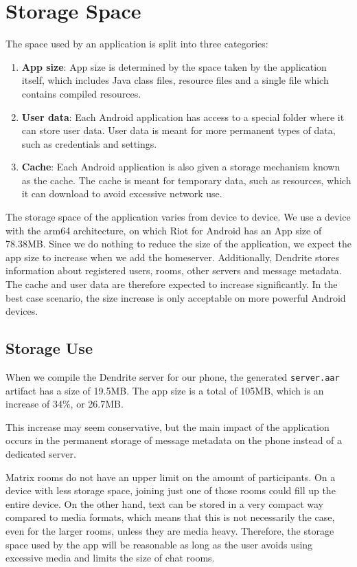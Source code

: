 \section{Storage Space}\label{sec:storage_space}
The space used by an application is split into three categories:
\begin{enumerate}
	\item{
	      \textbf{App size}:
		  App size is determined by the space taken by the application itself, which includes Java class files, resource files and a single file which contains compiled resources\cite{android_devdocs_apksize}.
	      }
	\item{
	      \textbf{User data}:
		  Each Android application has access to a special folder where it can store user data.
		  User data is meant for more permanent types of data, such as credentials and settings.
	      }
	\item{
	      \textbf{Cache}:
		  Each Android application is also given a storage mechanism known as the cache.
		  The cache is meant for temporary data, such as resources, which it can download to avoid excessive network use.
	      }
\end{enumerate}

The storage space of the application varies from device to device.
We use a device with the arm64 architecture, on which Riot for Android has an App size of 78.38MB\@.
Since we do nothing to reduce the size of the application, we expect the app size to increase when we add the homeserver.
Additionally, Dendrite stores information about registered users, rooms, other servers and message metadata.
The cache and user data are therefore expected to increase significantly.
In the best case scenario, the size increase is only acceptable on more powerful Android devices.

\subsection{Storage Use}\label{sec:storage_use}
When we compile the Dendrite server for our phone, the generated \texttt{server.aar} artifact has a size of 19.5MB\@.
The app size is a total of 105MB\@, which is an increase of 34\%, or 26.7MB\@.

This increase may seem conservative, but the main impact of the application occurs in the permanent storage of message metadata on the phone instead of a dedicated server.

Matrix rooms do not have an upper limit on the amount of participants. On a device with less storage space, joining just one of those rooms could fill up the entire device.
On the other hand, text can be stored in a very compact way compared to media formats, which means that this is not necessarily the case, even for the larger rooms, unless they are media heavy.
Therefore, the storage space used by the app will be reasonable as long as the user avoids using excessive media and limits the size of chat rooms.

